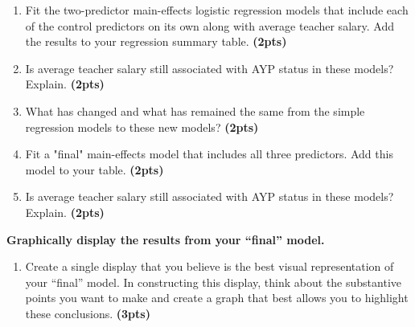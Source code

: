 \documentclass[]{article}
\begin{document}
\begin{enumerate}[resume]
\item Fit the two-predictor main-effects logistic regression models that include each of the control predictors on its own along with average teacher salary. Add the results to your regression summary table. \textbf{(2pts)}
\item Is average teacher salary still associated with AYP status in these models? Explain. \textbf{(2pts)}
\item What has changed and what has remained the same from the simple regression models to these new models? \textbf{(2pts)} 
\item Fit a "final" main-effects model that includes all three predictors. Add this model to your table. \textbf{(2pts)} 
\item Is average teacher salary still associated with AYP status in these models? Explain. \textbf{(2pts)}
\end{enumerate}

\vspace{\baselineskip}
\noindent\textbf{Graphically display the results from your ``final'' model.}

\begin{enumerate}[resume]
\item Create a single display that you believe is the best visual representation of your ``final'' model. In constructing this display, think about the substantive points you want to make and create a graph that best allows you to highlight these conclusions. \textbf{(3pts)}
\end{enumerate}
\end{document}
